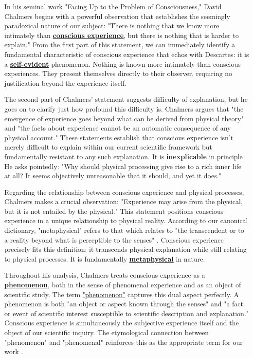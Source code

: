 \documentclass[runningheads]{llncs}
\newcommand{\lib}[2]{\href{https://dna-platform.github.io/inexplicable-phenomena#1}{#2}\xspace}
\begin{document}
In his seminal work \href{http://consc.net/papers/facing.pdf}{"Facing Up to the Problem of Consciousness,"}\xspace David Chalmers begins with a powerful observation that establishes the seemingly paradoxical nature of our subject: "There is nothing that we know more intimately than \lib{/dictionary/conscious-experience.html}{\textbf{conscious experience}}, but there is nothing that is harder to explain." From the first part of this statement, we can immediately identify a fundamental characteristic of conscious experience that echos with Descartes: it is a \lib{/dictionary/self-evident.html}{\textbf{self-evident}} phenomenon. Nothing is known more intimately than conscious experiences. They present themselves directly to their observer, requiring no justification beyond the experience itself.

The second part of Chalmers' statement suggests difficulty of explanation, but he goes on to clarify just how profound this difficulty is. Chalmers argues that "the emergence of experience goes beyond what can be derived from physical theory" and "the facts about experience cannot be an automatic consequence of any physical account." These statements establish that conscious experience isn't merely difficult to explain within our current scientific framework but fundamentally resistant to any such explanation. It is \lib{/dictionary/inexplicable.html}{\textbf{inexplicable}} in principle He asks pointedly: "Why should physical processing give rise to a rich inner life at all? It seems objectively unreasonable that it should, and yet it does."

Regarding the relationship between conscious experience and physical processes, Chalmers makes a crucial observation: "Experience may arise from the physical, but it is not entailed by the physical." This statement positions conscious experience in a unique relationship to physical reality. According to our canonical dictionary, "metaphysical" refers to that which relates to "the transcendent or to a reality beyond what is perceptible to the senses" \cite{DictionaryMV}. Conscious experience precisely fits this definition: it transcends physical explanation while still relating to physical processes. It is fundamentally \lib{/dictionary/metaphysical.html}{\textbf{metaphysical}} in nature.

Throughout his analysis, Chalmers treats conscious experience as a \lib{/dictionary/phenomenon.html}{\textbf{phenomenon}}, both in the sense of phenomenal experience and as an object of scientific study. The term \lib{/encyclopedia/noumena.html}{"phenomenon"} captures this dual aspect perfectly. A phenomenon is both "an object or aspect known through the senses" and "a fact or event of scientific interest susceptible to scientific description and explanation." Conscious experience is simultaneously the subjective experience itself and the object of our scientific inquiry. The etymological connection between "phenomenon" and "phenomenal" reinforces this as the appropriate term for our work \cite{Bader2022}.
\end{document}
